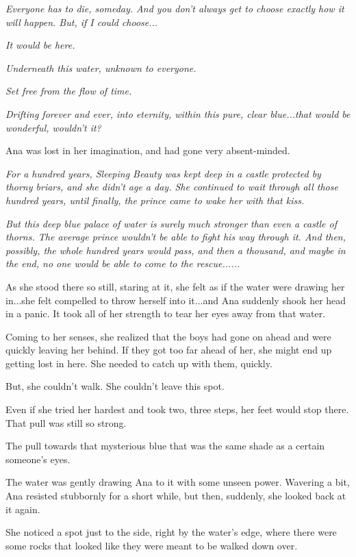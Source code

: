 \documentclass[
]{article}
\begin{document}
\emph{Everyone has to die, someday. And you don't always get to choose
exactly how it will happen. But, if I could choose...}

\emph{It would be here.}

\emph{Underneath this water, unknown to everyone.}

\emph{Set free from the flow of time.}

\emph{Drifting forever and ever, into eternity, within this pure, clear
blue...that would be wonderful, wouldn't it?}

Ana was lost in her imagination, and had gone very absent-minded.

\emph{For a hundred years, Sleeping Beauty was kept deep in a castle
protected by thorny briars, and she didn't age a day. She continued to
wait through all those hundred years, until finally, the prince came to
wake her with that kiss.}

\emph{But this deep blue palace of water is surely much stronger than
even a castle of thorns. The average prince wouldn't be able to fight
his way through it. And then, possibly, the whole hundred years would
pass, and then a thousand, and maybe in the end, no one would be able to
come to the rescue......}

As she stood there so still, staring at it, she felt as if the water
were drawing her in...she felt compelled to throw herself into it...and
Ana suddenly shook her head in a panic. It took all of her strength to
tear her eyes away from that water.

Coming to her senses, she realized that the boys had gone on ahead and
were quickly leaving her behind. If they got too far ahead of her, she
might end up getting lost in here. She needed to catch up with them,
quickly.

But, she couldn't walk. She couldn't leave this spot.

Even if she tried her hardest and took two, three steps, her feet would
stop there. That pull was still so strong.

The pull towards that mysterious blue that was the same shade as a
certain someone's eyes.

The water was gently drawing Ana to it with some unseen power. Wavering
a bit, Ana resisted stubbornly for a short while, but then, suddenly,
she looked back at it again.

She noticed a spot just to the side, right by the water's edge, where
there were some rocks that looked like they were meant to be walked down
over.
\end{document}
